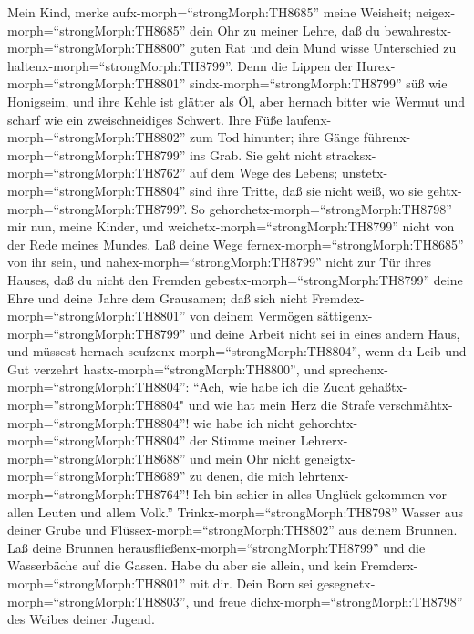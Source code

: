  Mein Kind, merke aufx-morph=``strongMorph:TH8685'' meine
Weisheit; neigex-morph=``strongMorph:TH8685'' dein Ohr zu meiner Lehre,
 daß du bewahrestx-morph=``strongMorph:TH8800'' guten Rat
und dein Mund wisse Unterschied zu haltenx-morph=``strongMorph:TH8799''.
 Denn die Lippen der Hurex-morph=``strongMorph:TH8801''
sindx-morph=``strongMorph:TH8799'' süß wie Honigseim, und ihre Kehle ist
glätter als Öl,  aber hernach bitter wie Wermut und scharf
wie ein zweischneidiges Schwert.  Ihre Füße
laufenx-morph=``strongMorph:TH8802'' zum Tod hinunter; ihre Gänge
führenx-morph=``strongMorph:TH8799'' ins Grab.  Sie geht
nicht stracksx-morph=``strongMorph:TH8762'' auf dem Wege des Lebens;
unstetx-morph=``strongMorph:TH8804'' sind ihre Tritte, daß sie nicht
weiß, wo sie gehtx-morph=``strongMorph:TH8799''.  So
gehorchetx-morph=``strongMorph:TH8798'' mir nun, meine Kinder, und
weichetx-morph=``strongMorph:TH8799'' nicht von der Rede meines Mundes.
 Laß deine Wege fernex-morph=``strongMorph:TH8685'' von ihr
sein, und nahex-morph=``strongMorph:TH8799'' nicht zur Tür ihres Hauses,
 daß du nicht den Fremden
gebestx-morph=``strongMorph:TH8799'' deine Ehre und deine Jahre dem
Grausamen;  daß sich nicht
Fremdex-morph=``strongMorph:TH8801'' von deinem Vermögen
sättigenx-morph=``strongMorph:TH8799'' und deine Arbeit nicht sei in
eines andern Haus,  und müssest hernach
seufzenx-morph=``strongMorph:TH8804'', wenn du Leib und Gut verzehrt
hastx-morph=``strongMorph:TH8800'',  und
sprechenx-morph=``strongMorph:TH8804'': ``Ach, wie habe ich die Zucht
gehaßtx-morph=''strongMorph:TH8804" und wie hat mein Herz die Strafe
verschmähtx-morph=``strongMorph:TH8804''!  wie habe ich
nicht gehorchtx-morph=``strongMorph:TH8804'' der Stimme meiner
Lehrerx-morph=``strongMorph:TH8688'' und mein Ohr nicht
geneigtx-morph=``strongMorph:TH8689'' zu denen, die mich
lehrtenx-morph=``strongMorph:TH8764''!  Ich bin schier in
alles Unglück gekommen vor allen Leuten und allem Volk.'' 
Trinkx-morph=``strongMorph:TH8798'' Wasser aus deiner Grube und
Flüssex-morph=``strongMorph:TH8802'' aus deinem Brunnen. 
Laß deine Brunnen herausfließenx-morph=``strongMorph:TH8799'' und die
Wasserbäche auf die Gassen.  Habe du aber sie allein, und
kein Fremderx-morph=``strongMorph:TH8801'' mit dir.  Dein
Born sei gesegnetx-morph=``strongMorph:TH8803'', und freue
dichx-morph=``strongMorph:TH8798'' des Weibes deiner Jugend.
